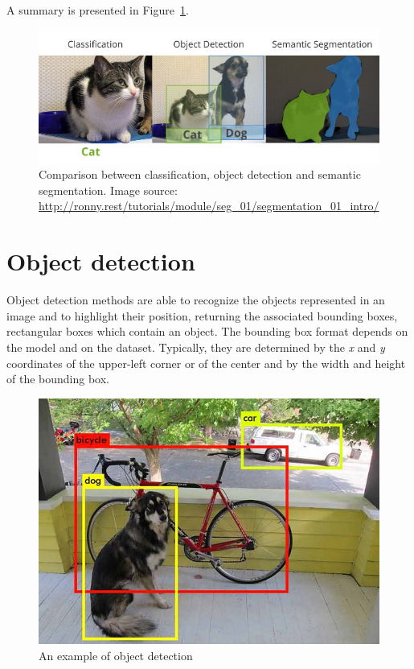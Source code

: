 \documentclass[%
    corpo=12pt,
    twoside,
    stile=classica,   
    tipotesi=magistrale,
    evenboxes,
    english,
	numerazioneromana,
]{toptesi}
\begin{document}
A summary is presented in Figure~\ref{fig:classdetseg}.

\begin{figure}
	\centering
	\includegraphics[width=.9\textwidth]{imgs/classification_detection_segmentaion.jpeg}
	\caption[Comparison between classification, object detection and semantic segmentation]{Comparison between classification, object detection and semantic segmentation. Image source: \url{http://ronny.rest/tutorials/module/seg_01/segmentation_01_intro/}}
	\label{fig:classdetseg}
\end{figure}

\section{Object detection}\label{sec:detection}
Object detection methods are able to recognize the objects represented in an image and to highlight their position, returning the associated bounding boxes, rectangular boxes which contain an object. The bounding box format depends on the model and on the dataset. Typically, they are determined by the \textit{x} and \textit{y} coordinates of the upper-left corner
or of the center
and by the width and height of the bounding box.

\begin{figure}[ht]
	\centering
	\includegraphics[width=.65\textwidth]{imgs/yolo_detection.png}
	\caption{An example of object detection\cite{redmon2016look}}
\end{figure}
\end{document}
